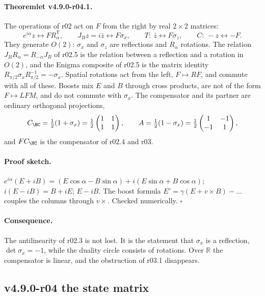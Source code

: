 \paragraph{Theoremlet v4.9.0-r04.1.}
The operations of r02 act on \(F\) from the right by real \(2\times2\) matrices:
\[
e^{i\alpha}z\leftrightarrow FR_\alpha^{\mathsf T},\qquad
J_Bz=i\bar z\leftrightarrow F\sigma_x,\qquad
T:\ \bar z\leftrightarrow F\sigma_z,\qquad
C:\ -z\leftrightarrow -F .
\]
They generate \(O(2)\): \(\sigma_x\) and \(\sigma_z\) are reflections and \(R_\alpha\) rotations.  The relation
\(J_BR_\alpha=R_{-\alpha}J_B\) of r02.5 is the relation between a reflection and a rotation in \(O(2)\), and the Enigma
composite of r02.5 is the matrix identity \(R_{\pi/2}\sigma_xR_{\pi/2}^{-1}=-\sigma_x\).  Spatial rotations act from the
left, \(F\mapsto RF\), and commute with all of these.  Boosts mix \(E\) and \(B\) through cross products, are not of the
form \(F\mapsto LFM\), and do not commute with \(\sigma_x\).  The compensator and its partner are ordinary orthogonal
projections,
\[
C_{\HC}=\tfrac12(1+\sigma_x)=\tfrac12\begin{pmatrix}1&1\\1&1\end{pmatrix},\qquad
A=\tfrac12(1-\sigma_x)=\tfrac12\begin{pmatrix}1&-1\\-1&1\end{pmatrix},
\]
and \(FC_{\HC}\) is the compensator of r02.4 and r03.

\paragraph{Proof sketch.}
\(e^{i\alpha}(E+iB)=(E\cos\alpha-B\sin\alpha)+i(E\sin\alpha+B\cos\alpha)\); \(i(E-iB)=B+iE\); \(E-iB\).  The boost
formula \(E'=\gamma(E+v\times B)-\dots\) couples the columns through \(v\times\).  Checked numerically.  \(\square\)

\paragraph{Consequence.}
The antilinearity of r02.3 is not lost.  It is the statement that \(\sigma_x\) is a reflection, \(\det\sigma_x=-1\),
while the duality circle consists of rotations.  Over \(\mathbb R\) the compensator is linear, and the obstruction of
r03.1 disappears.

\subsection*{v4.9.0-r04 the state matrix}
\label{subsec:v490-r04-state}

